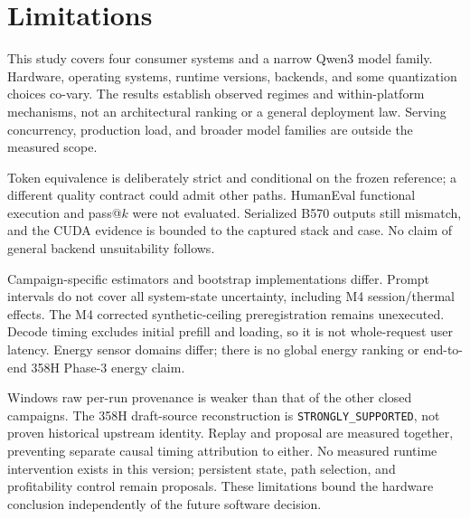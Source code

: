 \section{Limitations}
\label{sec:limitations}
This study covers four consumer systems and a narrow Qwen3 model family. Hardware, operating systems, runtime versions, backends, and some quantization choices co-vary. The results establish observed regimes and within-platform mechanisms, not an architectural ranking or a general deployment law. Serving concurrency, production load, and broader model families are outside the measured scope.

Token equivalence is deliberately strict and conditional on the frozen reference; a different quality contract could admit other paths. HumanEval functional execution and pass@$k$ were not evaluated. Serialized B570 outputs still mismatch, and the CUDA evidence is bounded to the captured stack and case. No claim of general backend unsuitability follows.

Campaign-specific estimators and bootstrap implementations differ. Prompt intervals do not cover all system-state uncertainty, including M4 session/thermal effects. The M4 corrected synthetic-ceiling preregistration remains unexecuted. Decode timing excludes initial prefill and loading, so it is not whole-request user latency. Energy sensor domains differ; there is no global energy ranking or end-to-end 358H Phase-3 energy claim.

Windows raw per-run provenance is weaker than that of the other closed campaigns. The 358H draft-source reconstruction is \texttt{STRONGLY\_SUPPORTED}, not proven historical upstream identity. Replay and proposal are measured together, preventing separate causal timing attribution to either. No measured runtime intervention exists in this version; persistent state, path selection, and profitability control remain proposals. These limitations bound the hardware conclusion independently of the future software decision.
